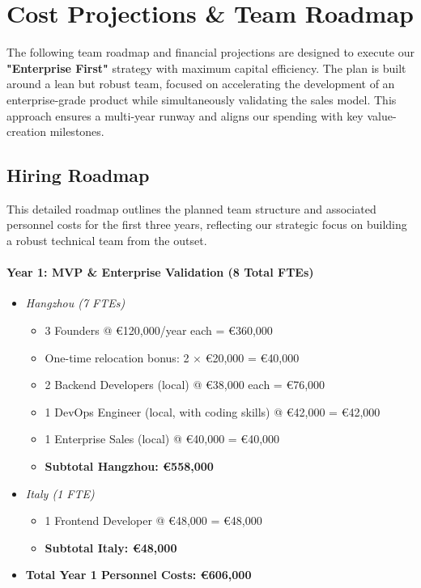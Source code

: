 \documentclass[11pt, a4paper, oneside]{article}
\begin{document}
\section{Cost Projections \& Team Roadmap}

The following team roadmap and financial projections are designed to execute our \textbf{"Enterprise First"} strategy with maximum capital efficiency. The plan is built around a lean but robust team, focused on accelerating the development of an enterprise-grade product while simultaneously validating the sales model. This approach ensures a multi-year runway and aligns our spending with key value-creation milestones.

\subsection{Hiring Roadmap}
This detailed roadmap outlines the planned team structure and associated personnel costs for the first three years, reflecting our strategic focus on building a robust technical team from the outset.

\paragraph{Year 1: MVP \& Enterprise Validation (8 Total FTEs)}
\begin{itemize}
    \item \textit{Hangzhou (7 FTEs)}
    \begin{itemize}
        \item 3 Founders @ \euro{120,000}/year each = \euro{360,000}
        \item One-time relocation bonus: 2 $\times$ \euro{20,000} = \euro{40,000}
        \item 2 Backend Developers (local) @ \euro{38,000} each = \euro{76,000}
        \item 1 DevOps Engineer (local, with coding skills) @ \euro{42,000} = \euro{42,000}
        \item 1 Enterprise Sales (local) @ \euro{40,000} = \euro{40,000}
        \item \textbf{Subtotal Hangzhou: \euro{558,000}}
    \end{itemize}
    \item \textit{Italy (1 FTE)}
    \begin{itemize}
        \item 1 Frontend Developer @ \euro{48,000} = \euro{48,000}
        \item \textbf{Subtotal Italy: \euro{48,000}}
    \end{itemize}
    \item \textbf{Total Year 1 Personnel Costs: \euro{606,000}}
\end{itemize}
\end{document}
